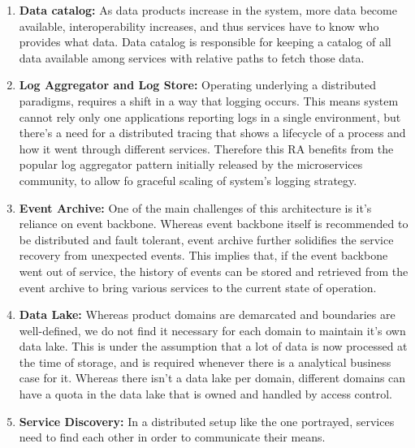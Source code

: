 \documentclass[runningheads]{llncs}
\begin{document}
\begin{enumerate}
    \item \textbf{Data catalog:} As data products increase in the system, more data become available, interoperability increases, and thus services have to know who provides what data. Data catalog is responsible for keeping a catalog of all data available among services with relative paths to fetch those data. 
    \item \textbf{Log Aggregator and Log Store:} Operating underlying a distributed paradigms, requires a shift in a way that logging occurs. This means system cannot rely only one applications reporting logs in a single environment, but there's a need for a distributed tracing that shows a lifecycle of a process and how it went through different services. Therefore this RA benefits from the popular log aggregator pattern initially released by the microservices community, to allow fo graceful scaling of system's logging strategy. 
    \item \textbf{Event Archive:} One of the main challenges of this architecture is it's reliance on event backbone. Whereas event backbone itself is recommended to be distributed and fault tolerant, event archive further solidifies the service recovery from unexpected events. This implies that, if the event backbone went out of service, the history of events can be stored and retrieved from the event archive to bring various services to the current state of operation. 
    \item \textbf{Data Lake:} Whereas product domains are demarcated and boundaries are well-defined, we do not find it necessary for each domain to maintain it's own data lake. This is under the assumption that a lot of data is now processed at the time of storage, and is required whenever there is a analytical business case for it. Whereas there isn't a data lake per domain, different domains can have a quota in the data lake that is owned and handled by access control. 
    \item \textbf{Service Discovery:} In a distributed setup like the one portrayed, services need to find each other in order to communicate their means. 
    
    

\end{enumerate}
\end{document}
